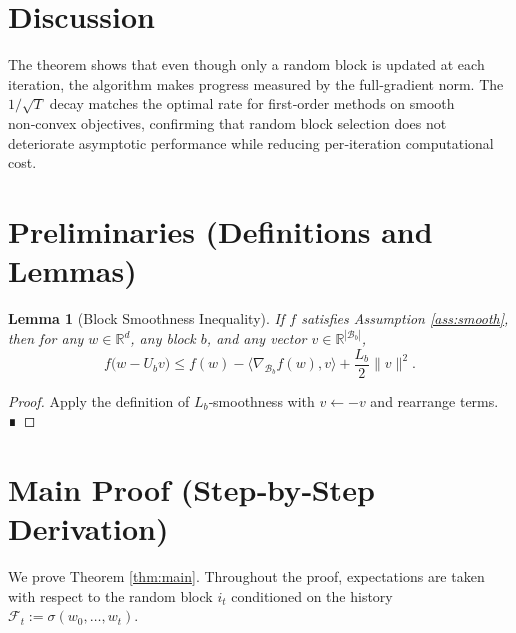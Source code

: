 \documentclass[11pt]{article}
\newtheorem{lemma}{Lemma}
\newcommand{\R}{\mathbb{R}}
\newcommand{\block}[1]{\mathcal{B}_{#1}}
\begin{document}
\section*{Discussion}
The theorem shows that even though only a random block is updated at each iteration, the algorithm makes progress measured by the full‑gradient norm. The $1/\sqrt{T}$ decay matches the optimal rate for first‑order methods on smooth non‑convex objectives, confirming that random block selection does not deteriorate asymptotic performance while reducing per‑iteration computational cost.

\newpage
\section*{Preliminaries (Definitions and Lemmas)}
\begin{lemma}[Block Smoothness Inequality]\label{lem:smooth}
If $f$ satisfies Assumption \ref{ass:smooth}, then for any $w\in\R^{d}$, any block $b$, and any vector $v\in\R^{|\block{b}|}$,
\[
f\big(w-U_{b}v\big)\le f(w)-\langle \nabla_{\block{b}} f(w),v\rangle+\frac{L_b}{2}\|v\|^{2}.
\]
\end{lemma}
\begin{proof}
Apply the definition of $L_b$‑smoothness with $v\gets -v$ and rearrange terms. ∎
\end{proof}

\section*{Main Proof (Step‑by‑Step Derivation)}
We prove Theorem \ref{thm:main}. Throughout the proof, expectations are taken with respect to the random block $i_t$ conditioned on the history $\mathcal{F}_t:=\sigma(w_0,\dots,w_t)$.
\end{document}
